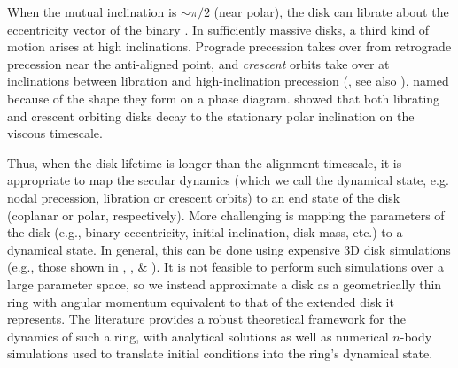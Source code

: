 \documentclass[twocolumn]{aastex631}
\begin{document}
When the mutual inclination is $\sim\pi/2$ (near polar), the disk can librate about the eccentricity vector of the binary \citep[e.g.,][]{verrier2009,farago2010,doolin2011}. In sufficiently massive disks, a third kind of motion arises at high inclinations. Prograde precession takes over from retrograde precession near the anti-aligned point, and {\it crescent} orbits take over at inclinations between libration and high-inclination precession (\citealt{chen2019}, see also \citealt{zanazzi2018}), named because of the shape they form on a phase diagram. \citet{abod2022} showed that both librating and crescent orbiting disks decay to the stationary polar inclination \citep[see][]{martin2019} on the viscous timescale.

Thus, when the disk lifetime is longer than 
the alignment timescale,
it is appropriate to map the secular dynamics (which we call the dynamical state, e.g. nodal precession, libration or crescent orbits) to an end state of the disk (coplanar or polar, respectively). More challenging is mapping the parameters of the disk (e.g., binary eccentricity, initial inclination, disk mass, etc.) to a dynamical state. In general, this can be done using expensive 3D disk simulations (e.g., those shown in \citealt{martin2019}, \citealt{smallwood2019}, \& \citealt{abod2022}). It is not feasible to perform such simulations over a large parameter space, so we instead approximate a disk as a geometrically thin ring with angular momentum equivalent to that of the extended disk it represents. The literature provides a robust theoretical framework for the dynamics of such a ring, with analytical solutions \citep{farago2010,zanazzi2018,martin2019} as well as numerical $n$-body simulations \citep{abod2022,lepp2022} used to translate initial conditions into the ring's dynamical state.
\end{document}
